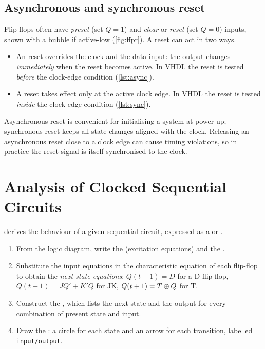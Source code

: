 \subsection{Asynchronous and synchronous reset}
Flip-flops often have \emph{preset} (set $Q=1$) and \emph{clear} or \emph{reset} (set $Q=0$) inputs, shown with a bubble if active-low (\cref{fig:ffpr}). A reset can act in two ways.
\begin{itemize}
  \item An  reset overrides the clock and the data input: the output changes \emph{immediately} when the reset becomes active. In VHDL the reset is tested \emph{before} the clock-edge condition (\cref{lst:async}).
  \item A  reset takes effect only at the active clock edge. In VHDL the reset is tested \emph{inside} the clock-edge condition (\cref{lst:sync}).
\end{itemize}
Asynchronous reset is convenient for initialising a system at power-up; synchronous reset keeps all state changes aligned with the clock. Releasing an asynchronous reset close to a clock edge can cause timing violations, so in practice the reset signal is itself synchronised to the clock.



\section{Analysis of Clocked Sequential Circuits}\label{sec:seq-analysis}
 derives the behaviour of a given sequential circuit, expressed as a  or .
\begin{enumerate}
  \item From the logic diagram, write the  (excitation equations) and the .
  \item Substitute the input equations in the characteristic equation of each flip-flop to obtain the \emph{next-state equations}: $Q(t+1)=D$ for a D flip-flop, $Q(t+1)=JQ'+K'Q$ for JK, $Q(t+1)=T\oplus Q$ for T.
  \item Construct the , which lists the next state and the output for every combination of present state and input.
  \item Draw the : a circle for each state and an arrow for each transition, labelled \texttt{input/output}.
\end{enumerate}

